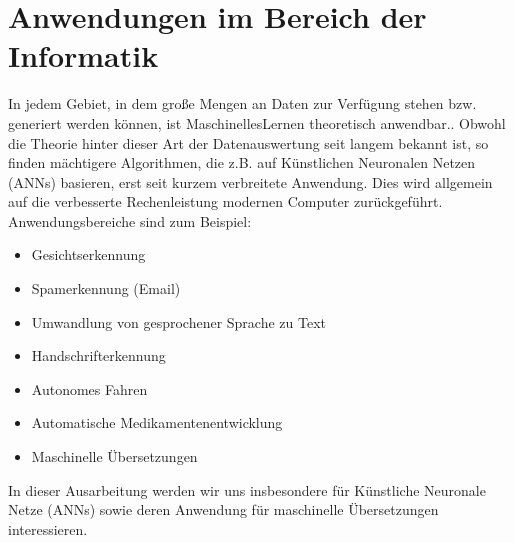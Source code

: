 \documentclass{thesisclass}
\begin{document}
\section{Anwendungen im Bereich der Informatik}
	In jedem Gebiet, in dem große Mengen an Daten zur Verf\"ugung stehen bzw. generiert werden können, ist \gls{MaschinellesLernen} theoretisch anwendbar.\cite{kour_2018}.
Obwohl die Theorie hinter dieser Art der Datenauswertung seit langem bekannt ist, so finden m\"achtigere Algorithmen, die z.B. auf Künstlichen Neuronalen Netzen (\gls{ANN}s) basieren, erst seit kurzem verbreitete Anwendung. Dies wird allgemein auf die verbesserte Rechenleistung modernen Computer zurückgeführt. \cite{DBLP:journals/corr/abs-1803-08971} \newline
	\newline Anwendungsbereiche sind zum Beispiel:
\begin{itemize}
	\item Gesichtserkennung
	\item Spamerkennung (Email)
	\item Umwandlung von gesprochener Sprache zu Text
	\item Handschrifterkennung
	\item Autonomes Fahren
	\item Automatische Medikamentenentwicklung
	\item Maschinelle Übersetzungen
\end{itemize}

In dieser Ausarbeitung werden wir uns insbesondere für Künstliche Neuronale Netze (\gls{ANN}s) sowie deren Anwendung für maschinelle Übersetzungen interessieren.
\end{document}
